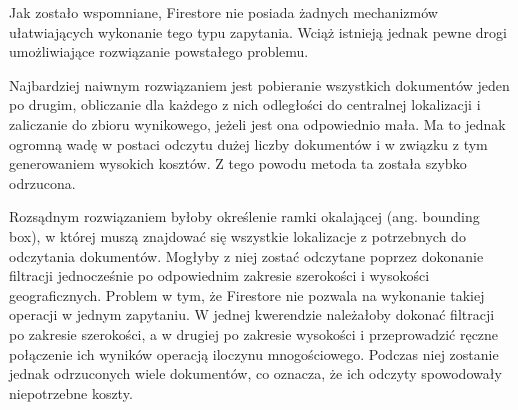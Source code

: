 Jak zostało wspomniane, Firestore nie posiada żadnych mechanizmów ułatwiających wykonanie tego typu zapytania. Wciąż istnieją jednak pewne drogi umożliwiające rozwiązanie powstałego problemu.

Najbardziej naiwnym rozwiązaniem jest pobieranie wszystkich dokumentów jeden po drugim, obliczanie dla każdego z nich odległości do centralnej lokalizacji i zaliczanie do zbioru wynikowego, jeżeli jest ona odpowiednio mała. Ma to jednak ogromną wadę w postaci odczytu dużej liczby dokumentów i w związku z tym generowaniem wysokich kosztów. Z tego powodu metoda ta została szybko odrzucona.

Rozsądnym rozwiązaniem byłoby określenie ramki okalającej (ang. bounding box), w której muszą znajdować się wszystkie lokalizacje z potrzebnych do odczytania dokumentów. Mogłyby z niej zostać odczytane poprzez dokonanie filtracji jednocześnie po odpowiednim zakresie szerokości i wysokości geograficznych. Problem w tym, że Firestore nie pozwala na wykonanie takiej operacji w jednym zapytaniu. W jednej kwerendzie należałoby dokonać filtracji po zakresie szerokości, a w drugiej po zakresie wysokości i przeprowadzić ręczne połączenie ich wyników operacją iloczynu mnogościowego. Podczas niej zostanie jednak odrzuconych wiele dokumentów, co oznacza, że ich odczyty spowodowały niepotrzebne koszty.




